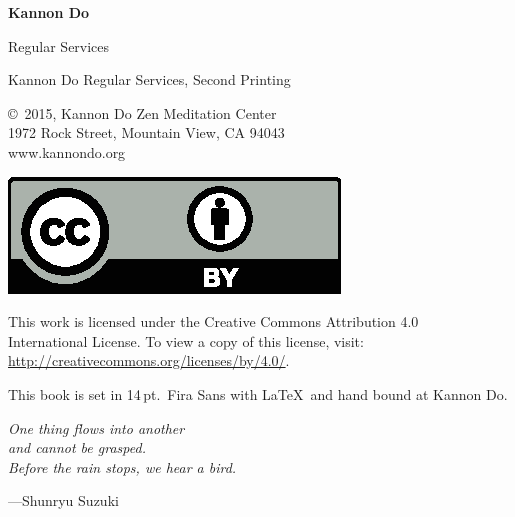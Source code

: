 \documentclass{kdo}
\begin{document}

\frontmatter
\begin{titlepage}
{\Huge\bf Kannon Do

  \bigskip\bigskip

 Regular Services}
\end{titlepage}

\begin{colophon}
Kannon Do Regular Services, Second Printing

\bigskip

\copyright\ 2015, Kannon Do Zen Meditation Center\\
1972 Rock Street, Mountain View, CA 94043\\
www.kannondo.org

\includegraphics{by}

This work is licensed under the Creative Commons Attribution 4.0\\
International License. To view a copy of this license, visit:\\
\url{http://creativecommons.org/licenses/by/4.0/}.

\bigskip

This book is set in 14\,pt.\ Fira Sans with \LaTeX\ and hand bound at Kannon Do.
\end{colophon}

\begin{dedication}
\fontsize{17pt}{21pt}\selectfont\em
\setlength{\parskip}{18pt plus 2pt}
One thing flows into another\\
and cannot be grasped.\\
Before the rain stops, we hear a bird.

---Shunryu Suzuki
\end{dedication}

\cleardoublepage

\tableofcontents
\end{document}
